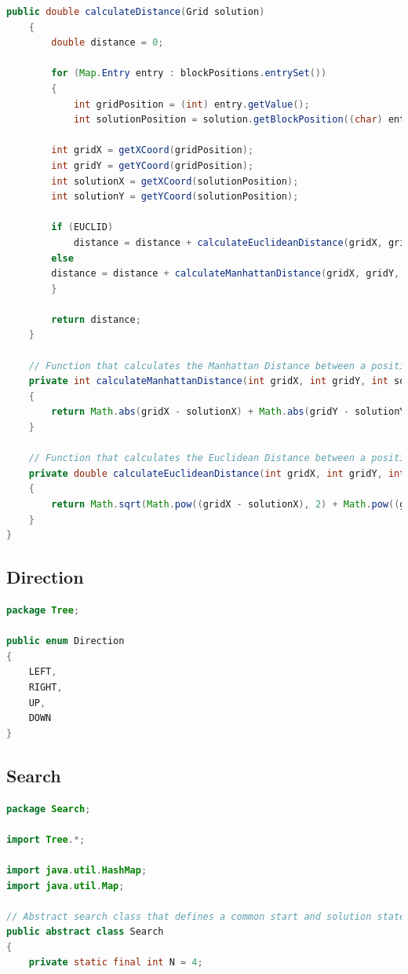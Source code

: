 \documentclass{article}
\begin{document}
\begin{appendices}
\begin{lstlisting}[language=Java,mathescape=true]
	public double calculateDistance(Grid solution)
	{
		double distance = 0;
	
		for (Map.Entry entry : blockPositions.entrySet())
		{
			int gridPosition = (int) entry.getValue();
			int solutionPosition = solution.getBlockPosition((char) entry.getKey());
	
		int gridX = getXCoord(gridPosition);
		int gridY = getYCoord(gridPosition);
		int solutionX = getXCoord(solutionPosition);
		int solutionY = getYCoord(solutionPosition);
	
		if (EUCLID)
			distance = distance + calculateEuclideanDistance(gridX, gridY, solutionX, solutionY);
		else
		distance = distance + calculateManhattanDistance(gridX, gridY, solutionX, solutionY);
		}
	
		return distance;
	}

	// Function that calculates the Manhattan Distance between a position on this grid and on the solution grid.
	private int calculateManhattanDistance(int gridX, int gridY, int solutionX, int solutionY)
	{
		return Math.abs(gridX - solutionX) + Math.abs(gridY - solutionY);
	}

	// Function that calculates the Euclidean Distance between a position on this grid and on the solution grid.
	private double calculateEuclideanDistance(int gridX, int gridY, int solutionX, int solutionY)
	{
		return Math.sqrt(Math.pow((gridX - solutionX), 2) + Math.pow((gridY - solutionY), 2));
	}
}
\end{lstlisting}
		
		\subsection{Direction}
\begin{lstlisting}[language=Java]
package Tree;

public enum Direction
{
	LEFT,
	RIGHT,
	UP,
	DOWN
}
\end{lstlisting}
		
		\newpage
		\subsection{Search}
\begin{lstlisting}[language=Java]
package Search;

import Tree.*;

import java.util.HashMap;
import java.util.Map;

// Abstract search class that defines a common start and solution state, and provides a common expandNode() method.
public abstract class Search
{
	private static final int N = 4;


\end{lstlisting}
\end{appendices}
\end{document}
